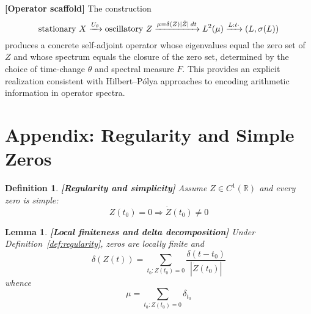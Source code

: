 \documentclass{article}
\newcommand{\tmstrong}[1]{\textbf{#1}}
\newtheorem{definition}{Definition}
\newtheorem{lemma}{Lemma}
\begin{document}
\begin{remark}
  {\tmstrong{[Operator scaffold]\label{labelrem:scaffold}}} The construction
  \begin{equation}
    \text{stationary } X \xrightarrow{U_{\theta}} \text{oscillatory } Z
    \xrightarrow{\mu = \delta (Z) | \dot{Z} |  \hspace{0.17em} dt} L^2 (\mu)
    \xrightarrow{L : t \cdot} (L, \sigma (L))
  \end{equation}
  produces a concrete self-adjoint operator whose eigenvalues equal the zero
  set of $Z$ and whose spectrum equals the closure of the zero set, determined
  by the choice of time-change $\theta$ and spectral measure $F$. This
  provides an explicit realization consistent with Hilbert--P{\'o}lya
  approaches to encoding arithmetic information in operator spectra.
\end{remark}

\section{Appendix: Regularity and Simple Zeros}\label{sec:appendix}

\begin{definition}
  {\tmstrong{[Regularity and simplicity]\label{def:regularity}}} Assume $Z \in
  C^1 (\mathbb{R})$ and every zero is simple:
  \begin{equation}
    Z (t_0) = 0 \Rightarrow \dot{Z} (t_0) \neq 0
  \end{equation}
\end{definition}

\begin{lemma}
  {\tmstrong{[Local finiteness and delta decomposition]\label{lem:delta}
  }}Under Definition~\ref{def:regularity}, zeros are locally finite and
  \begin{equation}
    \delta (Z (t)) = \sum_{t_0 : Z (t_0) = 0} \frac{\delta (t - t_0)}{|
    \dot{Z} (t_0) |}
  \end{equation}
  whence
  \begin{equation}
    \mu = \sum_{t_0 : Z (t_0) = 0} \delta_{t_0}
  \end{equation}
\end{lemma}
\end{document}
